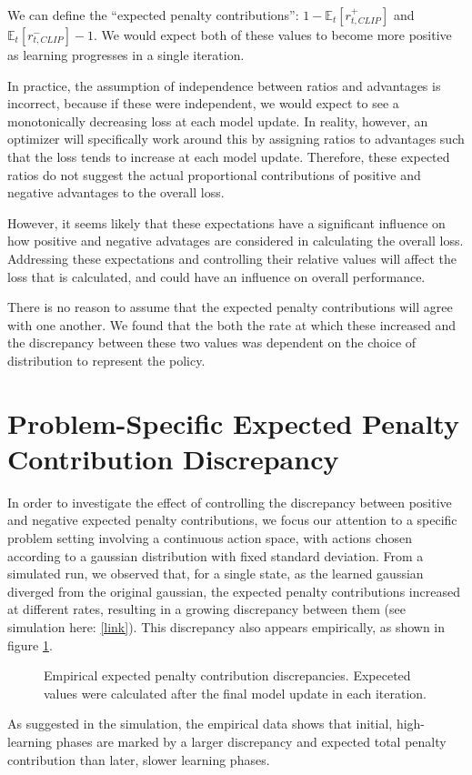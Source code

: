 \documentclass[letterpaper,twocolumn,10pt]{article}
\begin{document}
We can define the ``expected penalty contributions'':
$1 - \mathbb{E}_t[r_{t, CLIP}^+]$ and $\mathbb{E}_t[r_{t, CLIP}^-] - 1$. We
would expect both of these values to become more positive as learning
progresses in a single iteration.

In practice, the assumption of independence between ratios and advantages is
incorrect, because if these were independent, we would expect to see a
monotonically decreasing loss at each model update. In reality, however, an
optimizer will specifically work around this by assigning ratios to advantages
such that the loss tends to increase at each model update. Therefore, these
expected ratios do not suggest the actual proportional contributions of
positive and negative advantages to the overall loss.

However, it seems likely that these expectations have a significant influence
on how positive and negative advatages are considered in calculating the
overall loss. Addressing these expectations and controlling their relative
values will affect the loss that is calculated, and could have an influence on
overall performance.

There is no reason to assume that the expected penalty contributions will agree
with one another. We found that the both the rate at which these increased and
the discrepancy between these two values was dependent on the choice of
distribution to represent the policy.

\section{Problem-Specific Expected Penalty Contribution Discrepancy}

In order to investigate the effect of controlling the discrepancy between
positive and negative expected penalty contributions, we focus our attention to
a specific problem setting involving a continuous action space, with actions
chosen according to a gaussian distribution with fixed standard deviation. From
a simulated run, we observed that, for a single state, as the learned gaussian
diverged from the original gaussian, the expected penalty contributions
increased at different rates, resulting in a growing discrepancy between them
(see simulation here:
\href{https://github.com/rish987/Reinforcement-Learning/blob/master/projects/dynamic_clipping/report/discrepancy.gif}{[link]}).
This discrepancy also appears empirically, as shown in figure \ref{fig:1}.
\begin{figure}
    \centering
    \scalebox{0.4}{}
    \caption{Empirical expected penalty contribution discrepancies. Expeceted
    values were calculated after the final model update in each iteration. }
    \label{fig:1}
\end{figure}
As suggested in the simulation, the empirical data shows that initial,
high-learning phases are marked by a larger discrepancy and expected total
penalty contribution than later, slower learning phases.
\end{document}
